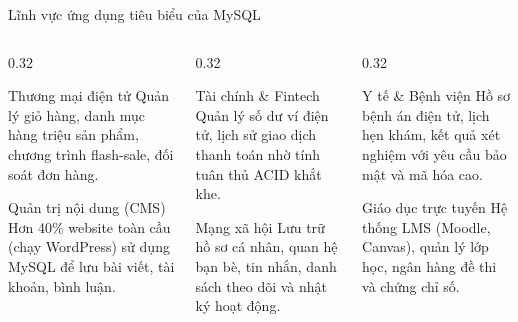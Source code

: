 \documentclass[aspectratio=169,11pt]{beamer}
\begin{document}
\begin{frame}{Lĩnh vực ứng dụng tiêu biểu của MySQL}
\begin{columns}[t]
  \begin{column}{0.32\textwidth}
    \begin{block}{Thương mại điện tử}
      \scriptsize
      Quản lý giỏ hàng, danh mục hàng triệu sản phẩm, chương trình flash-sale, đối soát đơn hàng.
    \end{block}
    \begin{block}{Quản trị nội dung (CMS)}
      \scriptsize
      Hơn 40\% website toàn cầu (chạy WordPress) sử dụng MySQL để lưu bài viết, tài khoản, bình luận.
    \end{block}
  \end{column}
  \begin{column}{0.32\textwidth}
    \begin{block}{Tài chính \& Fintech}
      \scriptsize
      Quản lý số dư ví điện tử, lịch sử giao dịch thanh toán nhờ tính tuân thủ ACID khắt khe.
    \end{block}
    \begin{block}{Mạng xã hội}
      \scriptsize
      Lưu trữ hồ sơ cá nhân, quan hệ bạn bè, tin nhắn, danh sách theo dõi và nhật ký hoạt động.
    \end{block}
  \end{column}
  \begin{column}{0.32\textwidth}
    \begin{block}{Y tế \& Bệnh viện}
      \scriptsize
      Hồ sơ bệnh án điện tử, lịch hẹn khám, kết quả xét nghiệm với yêu cầu bảo mật và mã hóa cao.
    \end{block}
    \begin{block}{Giáo dục trực tuyến}
      \scriptsize
      Hệ thống LMS (Moodle, Canvas), quản lý lớp học, ngân hàng đề thi và chứng chỉ số.
    \end{block}
  \end{column}
\end{columns}
\end{frame}

\end{document}
